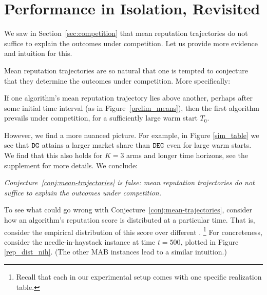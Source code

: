 \documentclass[../competing_bandits.tex]{subfiles}
\begin{document}
\section{Performance in Isolation, Revisited}\label{section:revisited}

We saw in Section~\ref{sec:competition} that mean reputation trajectories do not suffice to explain the outcomes under competition. Let us provide more evidence and intuition for this.

Mean reputation trajectories are so natural that one is tempted to conjecture that they determine the outcomes under competition. More specifically:
\begin{conjecture}\label{conj:mean-trajectories}
If one algorithm's mean reputation trajectory lies above another, perhaps after some initial time interval (\eg as in Figure~\ref{prelim_means}), then the first algorithm prevails under competition, for a sufficiently large warm start $T_0$.
\end{conjecture}

However, we find a more nuanced picture. For example, in Figure \ref{sim_table} we see that $\mathtt{DG}$ attains a larger market share than $\mathtt{DEG}$ even for large warm starts. We find that this also holds for $K = 3$ arms and longer time horizons, see the supplement for more details. We conclude:


\begin{finding}
\textit{
Conjecture~\ref{conj:mean-trajectories} is false: mean reputation trajectories do not suffice to explain the outcomes under competition.}
\end{finding}

To see what could go wrong with Conjecture~\ref{conj:mean-trajectories}, consider how an algorithm's reputation score is distributed at a particular time. That is, consider the empirical distribution of this score over different \MRVs.%
\footnote{Recall that each \MRV in our experimental setup comes with one specific realization table.} For concreteness, consider the needle-in-haystack instance at time $t=500$, plotted in Figure \ref{rep_dist_nih}. (The other MAB instances lead to a similar intuition.)
\end{document}
